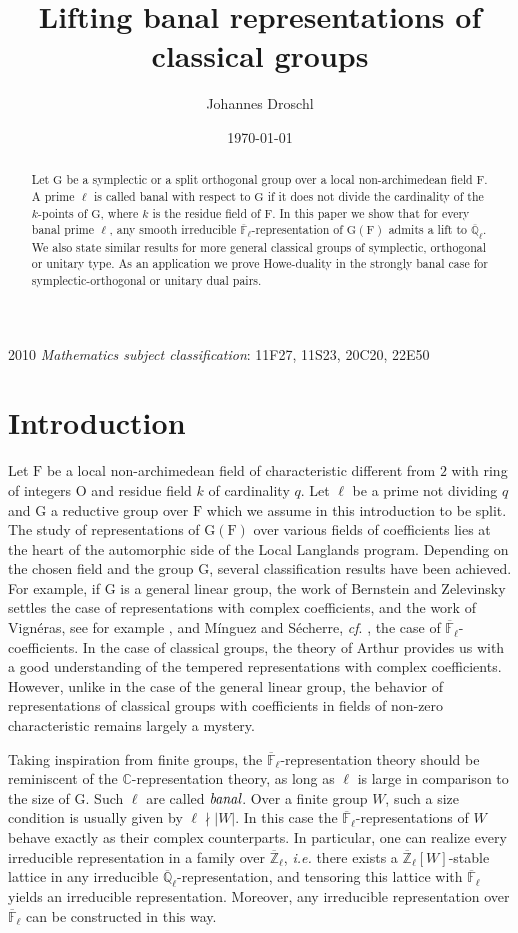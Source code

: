 \documentclass[10pt,a4paper]{article}
\date{\today}
\theoremstyle{remark}
\theoremstyle{definition}
\newcommand{\fl}{{\overline{\mathbb{F}}_\ell}}
\newcommand{\ql}{{\overline{\mathbb{Q}}_\ell}}
\newcommand{\zl}{{\overline{\mathbb{Z}}_\ell}}
\newcommand{\FF}{\mathrm{F}}
\newcommand{\mG}{\mathrm{G}   }
\newcommand{\io}{\mathrm{O}}
\newcommand{\CC}{\mathbb{C}}
\begin{document}
\title{Lifting banal representations of classical groups}
\author{Johannes Droschl}
\maketitle
\begin{abstract}
Let $\mG$ be a symplectic or a split orthogonal group over a local non-archimedean field $\FF$. A prime $\ell$ is called banal with respect to $\mG$ if it does not divide the cardinality of the $k$-points of $\mG$, where $k$ is the residue field of $\FF$. In this paper we show that for every banal prime $\ell$, any smooth irreducible $\fl$-representation of $\mG(\FF)$ admits a lift to $\ql$. We also state similar results for more general classical groups of symplectic, orthogonal or unitary type.
As an application we prove Howe-duality in the strongly banal case for symplectic-orthogonal or unitary dual pairs.
\end{abstract}
2010 \textit{Mathematics subject classification}: 11F27, 11S23, 20C20, 22E50
\section{Introduction}
Let $\FF$ be a local non-archimedean field of characteristic different from $2$ with ring of integers $\io$ and residue field $k$ of cardinality $q$. Let $\ell$ be a prime not dividing $q$ and $\mG$ a reductive group over $\FF$ which we assume in this introduction to be split. The study of representations of $\mG(\FF)$ over various fields of coefficients lies at the heart of the automorphic side of the Local Langlands program. Depending on the chosen field and the group $\mG$, several classification results have been achieved. For example, if $\mG$ is a general linear group, the work of Bernstein and Zelevinsky \cite{BerZel77} settles the case of representations with complex coefficients, and the work of Vignéras, see for example \cite{Vig96}, and Mínguez and Sécherre, \emph{cf}. \cite{MinSec14}, the case of $\fl$-coefficients. In the case of classical groups, the theory of Arthur \cite{arthur2013endoscopic} provides us with a good understanding of the tempered representations with complex coefficients. However, unlike in the case of the general linear group, the behavior of representations of classical groups with coefficients in fields of non-zero characteristic remains largely a mystery.

Taking inspiration from finite groups, the $\fl$-representation theory should be reminiscent of the $\CC$-representation theory, as long as $\ell$ is large in comparison to the size of $\mG$. Such $\ell$ are called $\emph{banal}$. Over a finite group $W$, such a size condition is usually given by $\ell\nmid\lvert W\lvert$. In this case the $\fl$-representations of $W$ behave exactly as their complex counterparts. In particular, one can realize every irreducible representation in a family over $\zl$, \emph{i.e.} there exists a $\zl[W]$-stable lattice in any irreducible $\ql$-representation, and tensoring this lattice with $\fl$ yields an irreducible representation. Moreover, any irreducible representation over $\fl$ can be constructed in this way.
\end{document}

